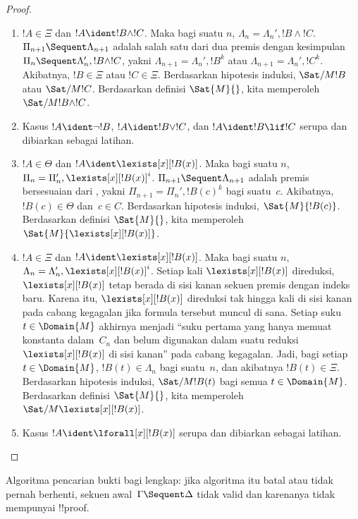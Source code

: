 \documentclass[../../../include/open-logic-section]{subfiles}
\begin{document}
\begin{proof}
\begin{enumerate}
  \item $!A \in \Xi$ dan $!A \ident !B \land !C$. Maka bagi suatu $n$,
  $\Lambda_n = \Lambda_n', !B \land !C$.
  $\Pi_{n+1} \Sequent \Lambda_{n+1}$ adalah salah satu dari dua premis
  \RightR{\land} dengan kesimpulan
  $\Pi_n \Sequent \Lambda'_n, !B \land !C$, yakni
  $\Lambda_{n+1} = \Lambda_n', !B^k$ atau
  $\Lambda_{n+1} = \Lambda_n', !C^k$. Akibatnya,
  $!B \in \Xi$ atau $!C \in \Xi$. Berdasarkan hipotesis induksi,
  $\Sat/{M}{!B}$ atau $\Sat/{M}{!C}$. Berdasarkan definisi $\Sat{M}{}$,
  kita memperoleh $\Sat/{M}{!B \land !C}$.

  \item Kasus $!A \ident \lnot !B$, $!A \ident !B \lor !C$, dan
  $!A \ident !B \lif !C$ serupa dan dibiarkan sebagai latihan.

  \item $!A \in \Theta$ dan $!A \ident \lexists[x][!B(x)]$. Maka bagi
  suatu $n$, $\Pi_n = \Pi_n', \lexists[x][!B(x)]^i$.
  $\Pi_{n+1} \Sequent \Lambda_{n+1}$ adalah premis bersesuaian dari
  \LeftR{\lexists}, yakni $\Pi_{n+1} = \Pi_n', !B(c)^k$ bagi suatu~$c$.
  Akibatnya, $!B(c) \in \Theta$ dan~$c \in C$. Berdasarkan hipotesis
  induksi, $\Sat{M}{!B(c)}$. Berdasarkan definisi $\Sat{M}{}$, kita
  memperoleh $\Sat{M}{\lexists[x][!B(x)]}$.

  \item $!A \in \Xi$ dan $!A \ident \lexists[x][!B(x)]$. Maka bagi suatu
  $n$, $\Lambda_n = \Lambda_n', \lexists[x][!B(x)]^i$. Setiap kali
  $\lexists[x][!B(x)]$ direduksi, $\lexists[x][!B(x)]$ tetap berada di sisi
  kanan sekuen premis dengan indeks baru. Karena itu,
  $\lexists[x][!B(x)]$ direduksi tak hingga kali di sisi kanan pada cabang
  kegagalan jika formula tersebut muncul di sana. Setiap suku
  $t \in \Domain{M}$ akhirnya menjadi ``suku pertama yang
  hanya memuat konstanta dalam~$C_n$ dan belum digunakan dalam suatu reduksi
  $\lexists[x][!B(x)]$ di sisi kanan'' pada cabang kegagalan. Jadi, bagi
  setiap $t \in \Domain{M}$, $!B(t) \in \Lambda_n$ bagi suatu~$n$, dan
  akibatnya $!B(t) \in \Xi$. Berdasarkan hipotesis induksi,
  $\Sat/{M}{!B(t)}$ bagi semua $t \in \Domain{M}$. Berdasarkan definisi
  $\Sat{M}{}$, kita memperoleh $\Sat/{M}{\lexists[x][!B(x)]}$.

  \item Kasus $!A \ident \lforall[x][!B(x)]$ serupa dan dibiarkan sebagai
  latihan.
\end{enumerate}
\end{proof}

\begin{cor} Algoritma pencarian bukti bagi
 lengkap: jika algoritma itu batal atau tidak pernah berhenti,
sekuen awal~$\Gamma \Sequent \Delta$ tidak valid dan karenanya tidak
mempunyai !!{proof}.
\end{cor}
\end{document}
